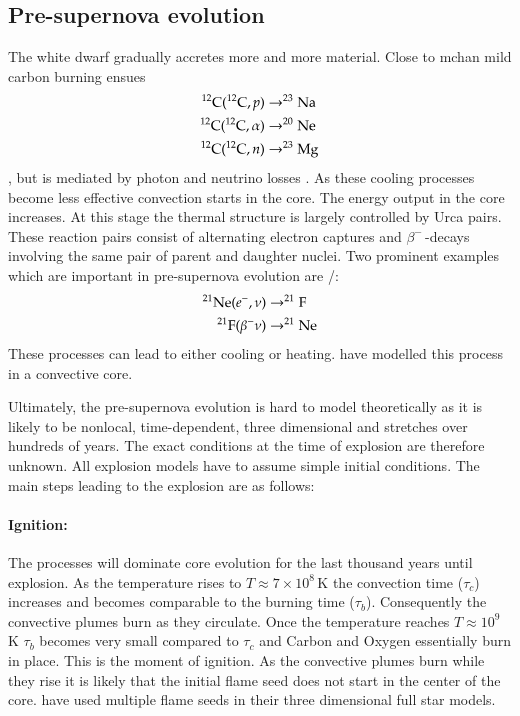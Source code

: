 \subsection{Pre-supernova evolution}
The white dwarf gradually accretes more and more material. Close to \gls{mchan} mild carbon burning ensues
\begin{align}
\nonumber
\Carb(\Carb,p) &\rightarrow \Na \\  \nonumber
\Carb(\Carb,\alpha) &\rightarrow \Ne \\ 
\Carb(\Carb,n) &\rightarrow \Mg[23]
\end{align},
but is mediated by photon and neutrino losses \citep{2005NuPhA.758..463L, 2007nps..book.....I}. As these cooling processes become less effective convection starts in the core. The energy output in the core increases. At this stage the thermal structure is largely controlled by Urca pairs. These reaction pairs consist of alternating electron captures and $\beta^-$\,-decays involving the same pair of parent and daughter nuclei. Two prominent examples which are important in pre-supernova evolution are \Ne[21]/\F[21]:
\begin{align}
\nonumber
\Ne[21](e^-, \nu) &\rightarrow \F[21] \\
\F[21](\beta^- \nu) &\rightarrow \Ne[21]
\end{align}
These processes can lead to either cooling or heating. \cite{2005NuPhA.758..463L} have modelled this process in a convective core. 

Ultimately, the pre-supernova evolution is hard to model theoretically as it is likely to be nonlocal, time-dependent, three dimensional and stretches over hundreds of years. The exact conditions at the time of explosion are therefore unknown. All explosion models have to assume simple initial conditions. The main steps leading to the explosion are as follows:

\paragraph{Ignition:} The \urca processes will dominate core evolution for the last thousand years until explosion. As the temperature rises to $T\approx7 \times 10^8$\,K \citep{2000ARA&A..38..191H} the convection time ($\tau_c$) increases and becomes comparable to the burning time ($\tau_b$). Consequently the convective plumes burn as they circulate. Once the temperature reaches $T\approx 10^9$\,K $\tau_b$ becomes very small compared to $\tau_c$ and Carbon and Oxygen essentially burn in place. 
This is the moment of ignition. As the convective plumes burn while they rise it is likely that the initial flame seed does not start in the center of the core. \cite{2005A&A...431..635R} have used multiple flame seeds in their three dimensional full star models.

